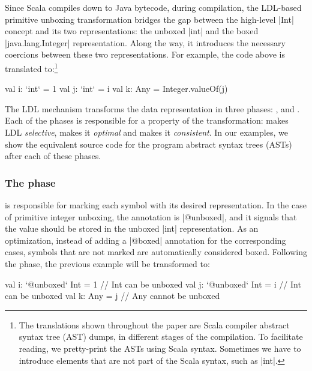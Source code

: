 Since Scala compiles down to Java bytecode, during compilation, the LDL-based primitive unboxing transformation bridges the gap between the high-level |Int| concept and its two representations: the unboxed |int| and the boxed |java.lang.Integer| representation. Along the way, it introduces the necessary coercions between these two representations. For example, the code above is translated to:\footnote{The translations shown throughout the paper are Scala compiler abstract syntax tree (AST) dumps, in different stages of the compilation. To facilitate reading, we pretty-print the ASTs using Scala syntax. Sometimes we have to introduce elements that are not part of the Scala syntax, such as |int|.}

\begin{lstlisting-nobreak}
val i: `int` = 1
val j: `int` = i
val k: Any = Integer.valueOf(j)
\end{lstlisting-nobreak}

The LDL mechanism transforms the data representation in three phases:
\inject{}, \coerce{} and \commit{}. Each of the phases is responsible
for a property of the transformation: \inject{} makes LDL
\emph{selective}, \coerce{} makes it \emph{optimal} and \commit{}
makes it \emph{consistent}. In our examples, we show the equivalent
source code for the program abstract syntax trees (ASTs) after each of
these phases.

\vspace{-0.2em}
\subsubsection{The \inject{} phase} is responsible for marking each symbol with its desired representation. In the case of primitive integer unboxing, the annotation is |@unboxed|, and it signals that the value should be stored in the unboxed |int| representation. As an optimization, instead of adding a |@boxed| annotation for the corresponding cases, symbols that are not marked are automatically considered boxed. Following the \inject{} phase, the previous example will be transformed to:

\vspace{-0.1em}
\begin{lstlisting-nobreak}
val i: `@unboxed` Int = 1 // Int can be unboxed
val j: `@unboxed` Int = i // Int can be unboxed
val k: Any = j                  // Any cannot be unboxed
\end{lstlisting-nobreak}



